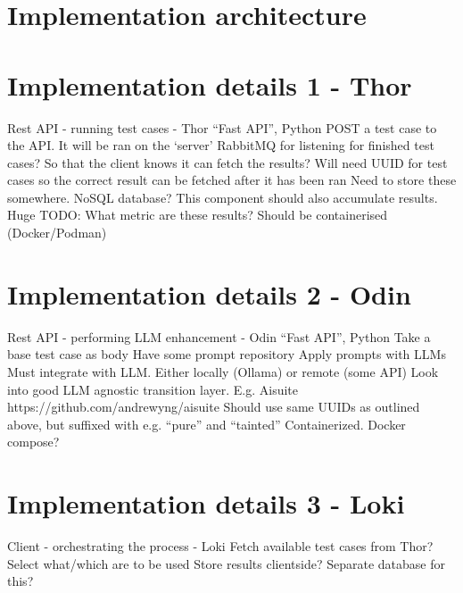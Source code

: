 
\chapter{Implementation architecture}
\chapter{Implementation details 1 - Thor}

Rest API - running test cases - Thor
“Fast API”, Python
POST a test case to the API. It will be ran on the ‘server’
RabbitMQ for listening for finished test cases? So that the client knows it can fetch the results?
Will need UUID for test cases so the correct result can be fetched after it has been ran
Need to store these somewhere. NoSQL database?
This component should also accumulate results.
Huge TODO: What metric are these results?
Should be containerised (Docker/Podman)

\chapter{Implementation details 2 - Odin}\label{sec:odinImplementation}

Rest API - performing LLM enhancement - Odin
“Fast API”, Python
Take a base test case as body
Have some prompt repository
Apply prompts with LLMs
Must integrate with LLM. Either locally (Ollama) or remote (some API)
Look into good LLM agnostic transition layer. E.g. Aisuite
https://github.com/andrewyng/aisuite
Should use same UUIDs as outlined above, but suffixed with e.g. “pure” and “tainted”
Containerized. Docker compose?

\chapter{Implementation details 3 - Loki}

Client - orchestrating the process - Loki
Fetch available test cases from Thor? Select what/which are to be used
Store results clientside? Separate database for this?